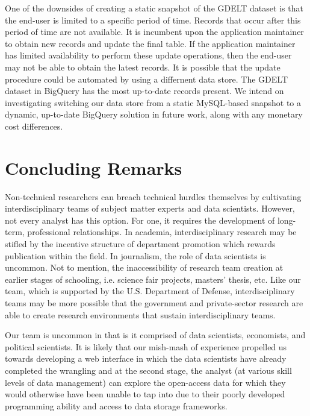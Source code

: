\documentclass[preprint,authoryear,12pt]{elsarticle/elsarticle}
\begin{document}
One of the downsides of creating a static snapshot of the GDELT dataset is that the end-user is limited to a specific period of time. Records that occur after this period of time are not available. It is incumbent upon the application maintainer to obtain new records and update the final table. If the application maintainer has limited availability to perform these update operations, then the end-user may not be able to obtain the latest records. It is possible that the update procedure could be automated by using a differnent data store. The GDELT dataset in BigQuery has the most up-to-date records present. We intend on investigating switching our data store from a static MySQL-based snapshot to a dynamic, up-to-date BigQuery solution in future work, along with any monetary cost differences.  

\section{Concluding Remarks}
\label{sec:conclusion}
Non-technical researchers can breach technical hurdles themselves by cultivating interdisciplinary teams of subject matter experts and data scientists. However, not every analyst has this option. For one, it requires the development of long-term, professional relationships. In academia, interdisciplinary research may be stifled by the incentive structure of department promotion which rewards publication within the field. In journalism, the role of data scientists is uncommon. Not to mention, the inaccessibility of research team creation at earlier stages of schooling, i.e. science fair projects, masters’ thesis, etc. Like our team, which is supported by the U.S. Department of Defense, interdisciplinary teams may be more possible that the government and private-sector research are able to create research environments that sustain interdisciplinary teams.

Our team is uncommon in that is it comprised of data scientists, economists, and political scientists. It is likely that our mish-mash of experience propelled us towards developing a web interface in which the data scientists have already completed the wrangling and at the second stage, the analyst (at various skill levels of data management) can explore the open-access data for which they would otherwise have been unable to tap into due to their poorly developed programming ability and access to data storage frameworks. 


\end{document}
